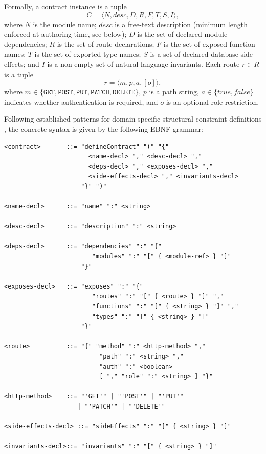\documentclass[review,12pt,3p]{elsarticle}
\begin{document}
Formally, a contract instance is a tuple
\begin{equation}
  C = \langle N, \mathit{desc}, D, R, F, T, S, I \rangle,
  \label{eq:contract-tuple}
\end{equation}
where $N$ is the module name; $\mathit{desc}$ is a free-text description
(minimum length enforced at authoring time, see below); $D$ is the set
of declared module dependencies; $R$ is the set of route declarations;
$F$ is the set of exposed function names; $T$ is the set of exported
type names; $S$ is a set of declared database side effects; and $I$ is
a non-empty set of natural-language invariants. Each route $r \in R$
is a tuple
\begin{equation}
  r = \langle m, p, a, [o] \rangle,
  \label{eq:route-tuple}
\end{equation}
where $m \in \{\texttt{GET}, \texttt{POST}, \texttt{PUT},
\texttt{PATCH}, \texttt{DELETE}\}$, $p$ is a path string, $a \in
\{\mathit{true}, \mathit{false}\}$ indicates whether authentication is
required, and $o$ is an optional role restriction.

Following established patterns for domain-specific structural constraint definitions \cite{stokke2023domain}, the concrete syntax is given by the following EBNF grammar:

\begin{verbatim}
<contract>       ::= "defineContract" "(" "{"
                       <name-decl> "," <desc-decl> ","
                       <deps-decl> "," <exposes-decl> ","
                       <side-effects-decl> "," <invariants-decl>
                     "}" ")"

<name-decl>      ::= "name" ":" <string>

<desc-decl>      ::= "description" ":" <string>

<deps-decl>      ::= "dependencies" ":" "{"
                        "modules" ":" "[" { <module-ref> } "]"
                     "}"

<exposes-decl>   ::= "exposes" ":" "{"
                        "routes" ":" "[" { <route> } "]" ","
                        "functions" ":" "[" { <string> } "]" ","
                        "types" ":" "[" { <string> } "]"
                     "}"

<route>          ::= "{" "method" ":" <http-method> ","
                          "path" ":" <string> ","
                          "auth" ":" <boolean>
                          [ "," "role" ":" <string> ] "}"

<http-method>    ::= "'GET'" | "'POST'" | "'PUT'"
                    | "'PATCH'" | "'DELETE'"

<side-effects-decl> ::= "sideEffects" ":" "[" { <string> } "]"

<invariants-decl>::= "invariants" ":" "[" { <string> } "]"
\end{verbatim}
\end{document}
